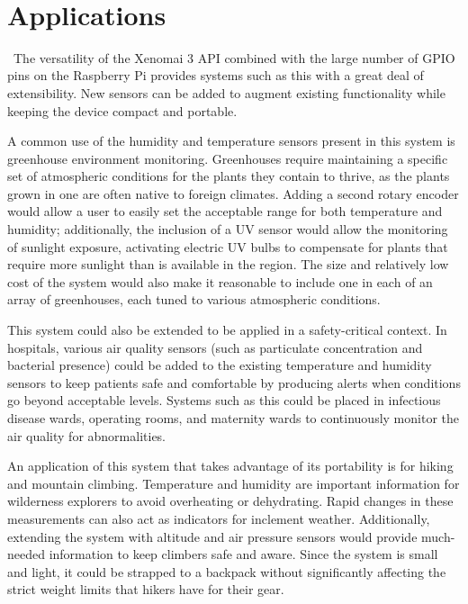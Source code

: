 \documentclass[letterpaper, 12pt]{article}
\begin{document}
~\newpage

\section{Applications}

~\indent The versatility of the Xenomai 3 API combined with the large number of GPIO pins on the Raspberry Pi provides systems such as this with a great deal of extensibility. New sensors can be added to augment existing functionality while keeping the device compact and portable.

\indent A common use of the humidity and temperature sensors present in this system is greenhouse environment monitoring. Greenhouses require maintaining a specific set of atmospheric conditions for the plants they contain to thrive, as the plants grown in one are often native to foreign climates. Adding a second rotary encoder would allow a user to easily set the acceptable range for both temperature and humidity; additionally, the inclusion of a UV sensor would allow the monitoring of sunlight exposure, activating electric UV bulbs to compensate for plants that require more sunlight than is available in the region. The size and relatively low cost of the system would also make it reasonable to include one in each of an array of greenhouses, each tuned to various atmospheric conditions. 

\indent This system could also be extended to be applied in a safety-critical context. In hospitals, various air quality sensors (such as particulate concentration and bacterial presence) could be added to the existing temperature and humidity sensors to keep patients safe and comfortable by producing alerts when conditions go beyond acceptable levels. Systems such as this could be placed in infectious disease wards, operating rooms, and maternity wards to continuously monitor the air quality for abnormalities.

\indent An application of this system that takes advantage of its portability is for hiking and mountain climbing. Temperature and humidity are important information for wilderness explorers to avoid overheating or dehydrating. Rapid changes in these measurements can also act as indicators for inclement weather. Additionally, extending the system with altitude and air pressure sensors would provide much-needed information to keep climbers safe and aware. Since the system is small and light, it could be strapped to a backpack without significantly affecting the strict weight limits that hikers have for their gear.
\end{document}
